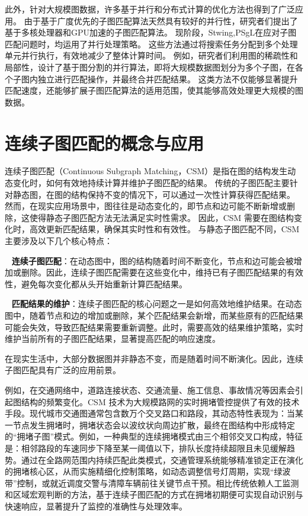 此外，针对大规模图数据，许多基于并行和分布式计算的优化方法也得到了广泛应用。
由于基于广度优先的子图匹配算法天然具有较好的并行性，研究者们提出了基于多核处理器和GPU加速的子图匹配算法。
现阶段，Stwing\cite{sm-stwing-DBLP:journals/pvldb/SunWWSL12},PSgL\cite{sm-psgl-DBLP:conf/sigmod/ShaoCCMYX14}在应对子图匹配问题时，均运用了并行处理策略。
这些方法通过将搜索任务分配到多个处理单元并行执行，有效地减少了整体计算时间。
例如，研究者们利用图的稀疏性和局部性，设计了基于图分割的并行算法，即将大规模数据图划分为多个子图，在各个子图内独立进行匹配操作，并最终合并匹配结果。
这类方法不仅能够显著提升匹配速度，还能够扩展子图匹配算法的适用范围，使其能够高效处理更大规模的图数据。


\section{连续子图匹配的概念与应用}
\label{csm-concept}
连续子图匹配（Continuous Subgraph Matching，CSM）是指在图的结构发生动态变化时，如何有效地持续计算并维护子图匹配的结果\cite{wang2023survey}。
传统的子图匹配主要针对静态图，在图的结构保持不变的情况下，可以通过一次性计算获得匹配结果。
然而，在现实应用场景中，图往往是动态变化的，即节点和边可能不断新增或删除，这使得静态子图匹配方法无法满足实时性需求。
因此，CSM 需要在图结构变化时，高效更新匹配结果，确保其实时性和有效性。
与静态子图匹配不同，CSM主要涉及以下几个核心特点：

\textbullet~ \textbf{连续子图匹配}：在动态图中，图的结构随着时间不断变化，节点和边可能会被增加或删除。因此，连续子图匹配需要在这些变化中，维持已有子图匹配结果的有效性，避免每次变化都从头开始重新计算匹配结果。

  \textbullet~ \textbf{匹配结果的维护}：连续子图匹配的核心问题之一是如何高效地维护结果。在动态图中，随着节点和边的增加或删除，某个匹配结果会新增，而某些原有的匹配结果可能会失效，导致匹配结果需要重新调整。此时，需要高效的结果维护策略，实时维护当前所有的子图匹配结果，显著提高匹配的响应速度。

在现实生活中，大部分数据图并非静态不变，而是随着时间不断演化。因此，连续子图匹配具有广泛的应用前景。

例如，在交通网络中，道路连接状态、交通流量、施工信息、事故情况等因素会引起图结构的频繁变化\cite{traffic-graph-matching-DBLP:journals/pvldb/SongGCW14}。CSM 技术为大规模路网的实时拥堵管控提供了有效的技术手段。现代城市交通图通常包含数万个交叉路口和路段，其动态特性表现为：当某一节点发生拥堵时，拥堵状态会以波纹状向周边扩散，最终在图结构中形成特定的“拥堵子图”模式。例如，一种典型的连续拥堵模式由三个相邻交叉口构成，特征是：相邻路段的车速同步下降至某一阈值以下，排队长度持续超限且未见缓解趋势。通过在全路网范围内持续匹配此类模式，交通管理系统能够精准锁定正在演化的拥堵核心区，从而实施精细化控制策略，如动态调整信号灯周期，实现“绿波带”控制，或就近调度交警与清障车辆前往关键节点干预。相比传统依赖人工监测和区域宏观判断的方法，基于连续子图匹配的方式在拥堵初期便可实现自动识别与快速响应，显著提升了监控的准确性与处理效率。

